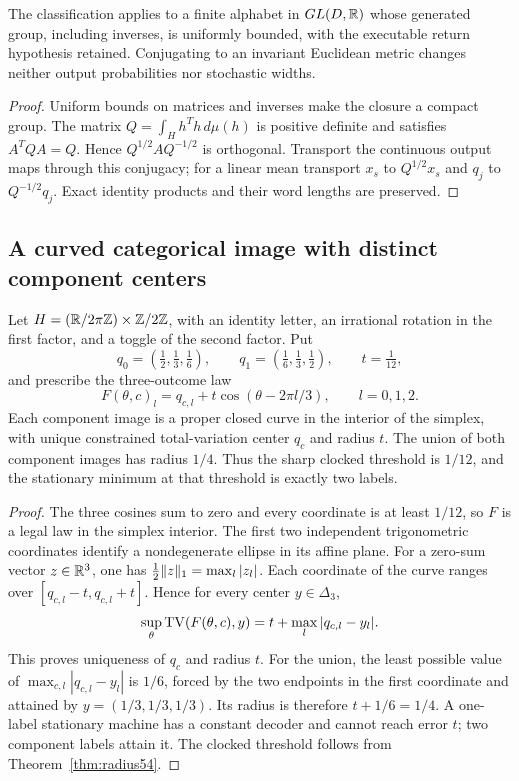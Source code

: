 \begin{proposition}\label{prop:similarity53}
The classification applies to a finite alphabet in $GL(D,\mathbb R)$ whose generated group, including inverses, is uniformly bounded, with the executable return hypothesis retained. Conjugating to an invariant Euclidean metric changes neither output probabilities nor stochastic widths.
\end{proposition}
\begin{proof}
Uniform bounds on matrices and inverses make the closure a compact group. The matrix $Q=\int_Hh^Th\,d\mu(h)$ is positive definite and satisfies $A^TQA=Q$. Hence $Q^{1/2}AQ^{-1/2}$ is orthogonal. Transport the continuous output maps through this conjugacy; for a linear mean transport $x_s$ to $Q^{1/2}x_s$ and $q_j$ to $Q^{-1/2}q_j$. Exact identity products and their word lengths are preserved.
\end{proof}

\subsection{A curved categorical image with distinct component centers}
\begin{proposition}\label{prop:curved55}
Let $H=(\mathbb R/2\pi\mathbb Z)\times\mathbb Z/2\mathbb Z$, with an identity letter, an irrational rotation in the first factor, and a toggle of the second factor. Put
\[
 q_0=(\tfrac12,\tfrac13,\tfrac16),\qquad
 q_1=(\tfrac16,\tfrac13,\tfrac12),\qquad t=\tfrac1{12},
\]
and prescribe the three-outcome law
\[
 F(\theta,c)_l=q_{c,l}+t\cos(\theta-2\pi l/3),\qquad l=0,1,2.
\]
Each component image is a proper closed curve in the interior of the simplex, with unique constrained total-variation center $q_c$ and radius $t$. The union of both component images has radius $1/4$. Thus the sharp clocked threshold is $1/12$, and the stationary minimum at that threshold is exactly two labels.
\end{proposition}
\begin{proof}
The three cosines sum to zero and every coordinate is at least $1/12$, so $F$ is a legal law in the simplex interior. The first two independent trigonometric coordinates identify a nondegenerate ellipse in its affine plane. For a zero-sum vector $z\in\mathbb R^3$, one has $\frac12\lVert z\rVert_1=\max_l|z_l|$. Each coordinate of the curve ranges over $[q_{c,l}-t,q_{c,l}+t]$. Hence for every center $y\in\Delta_3$,
\[
 \sup_\theta\operatorname{TV}(F(\theta,c),y)
       =t+\max_l|q_{c,l}-y_l|.
\]
This proves uniqueness of $q_c$ and radius $t$. For the union, the least possible value of $\max_{c,l}|q_{c,l}-y_l|$ is $1/6$, forced by the two endpoints in the first coordinate and attained by $y=(1/3,1/3,1/3)$. Its radius is therefore $t+1/6=1/4$. A one-label stationary machine has a constant decoder and cannot reach error $t$; two component labels attain it. The clocked threshold follows from Theorem~\ref{thm:radius54}.
\end{proof}

